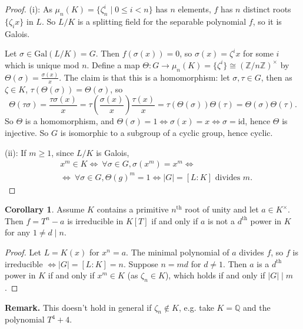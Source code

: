 \documentclass{article}
\theoremstyle{definition}
\newtheorem{cor}[theorem]{Corollary}
\begin{document}
\begin{proof}
    (i): As $\mu_n(K) = \{\zeta_n^i \mid 0\le i<n\}$ has $n$ elements, $f$ has $n$ distinct roots $\{\zeta_i x\}$ in $L$. So $L/K$ is a splitting field for the separable polynomial $f$, so it is Galois.

    Let $\sigma \in \text{Gal}(L/K) = G$. Then $f(\sigma(x))=0$, so $\sigma(x) = \zeta^i x$ for some $i$ which is unique mod $n$. Define a map $\Theta : G \to \mu_n(K)=\{\zeta^i\} \cong (\mathbb{Z}/n\mathbb{Z})^{\times}$ by $\Theta(\sigma) = \frac{\sigma(x)}{x}$. The claim is that this is a homomorphism: let $\sigma, \tau \in G$, then as $\zeta \in K$, $\tau(\Theta(\sigma))=\Theta(\sigma)$, so \[
    \Theta(\tau \sigma) = \frac{\tau \sigma(x)}{x} = \tau\left(\frac{\sigma(x)}{x}\right)  \frac{\tau(x)}{x} = \tau(\Theta(\sigma))\Theta(\tau)=\Theta(\sigma)\Theta(\tau).
    \]
    So $\Theta$ is a homomorphism, and $\Theta(\sigma)=1 \iff \sigma(x)=x \iff \sigma=\text{id}$, hence $\Theta$ is injective. So $G$ is isomorphic to a subgroup of a cyclic group, hence cyclic.
    \vspace{1mm}
    
    (ii): If $m\ge 1$, since $L/K$ is Galois,
    \begin{align*}
        &x^m \in K \iff ~\forall \sigma \in G, \sigma(x^m)=x^m \iff\\
        &\iff ~\forall \sigma \in G,\Theta(g)^m = 1 \iff |G|=[L:K] \text{ divides }m.
    \end{align*}
\end{proof}
\begin{cor}
    Assume $K$ contains a primitive $n^{\text{th}}$ root of unity and let $a \in K^\times$. Then $f=T^n-a$ is irreducible in $K[T]$ if and only if $a$ is not a $d^{\text{th}}$ power in $K$ for any $1 \neq d \mid n$.
\end{cor}
\begin{proof}
    Let $L=K(x)$ for $x^n=a$. The minimal polynomial of $a$ divides $f$, so $f$ is irreducible $\iff |G|=[L:K]=n$. Suppose $n=md$ for $d \neq 1$. Then $a$ is a $d^{\text{th}}$ power in $K$ if and only if $x^m \in K$ (as $\zeta_n \in K$), which holds if and only if $|G| \mid m$.
\end{proof}
\textbf{Remark.} This doesn't hold in general if $\zeta_n \not\in K$, e.g. take $K=\mathbb{Q}$ and the polynomial $T^4+4$.
\vspace{1mm}
\end{document}
